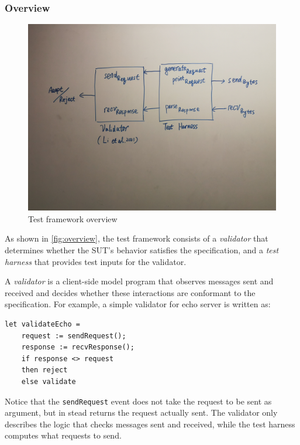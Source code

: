 \documentclass{article}
\newcommand{\ilc}[1]{\lstinline[style=customcoq]{#1}}
\begin{document}
\subsubsection{Overview}
\begin{figure}
  \centering
  \includegraphics[width=.9\textwidth]{figures/overview}
  \caption{Test framework overview}
  \label{fig:overview}
\end{figure}

As shown in \autoref{fig:overview}, the test framework consists of a {\em
  validator} that determines whether the SUT's behavior satisfies the
specification, and a {\em test harness} that provides test inputs for the
validator.

A {\em validator} is a client-side model program that observes messages sent and
received and decides whether these interactions are conformant to the
specification.  For example, a simple validator for echo server is written as:
\begin{lstlisting}[style=customcoq]
  let validateEcho =
    request := sendRequest();
    response := recvResponse();
    if response <> request
    then reject
    else validate
\end{lstlisting}
Notice that the \ilc{sendRequest} event does not take the request to be sent as
argument, but in stead returns the request actually sent.  The validator only
describes the logic that checks messages sent and received, while the test
harness computes what requests to send.
\end{document}
